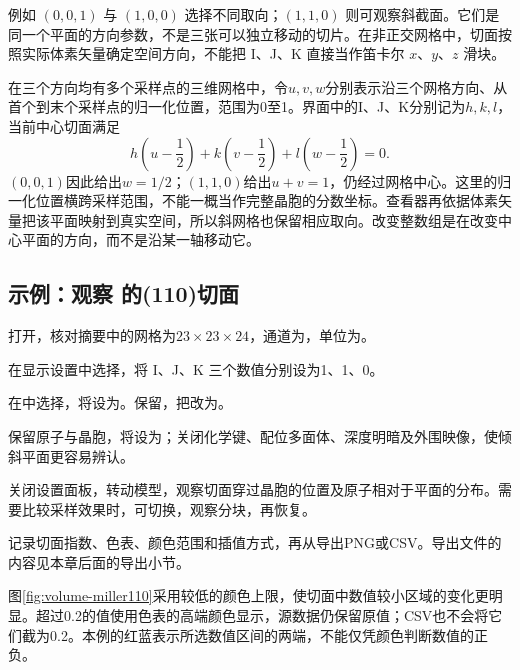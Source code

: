 例如 $(0,0,1)$ 与 $(1,0,0)$ 选择不同取向；$(1,1,0)$ 则可观察斜截面。它们是同一个平面的方向参数，不是三张可以独立移动的切片。在非正交网格中，切面按照实际体素矢量确定空间方向，不能把 I、J、K 直接当作笛卡尔 $x$、$y$、$z$ 滑块。


在三个方向均有多个采样点的三维网格中，令$u,v,w$分别表示沿三个网格方向、从首个到末个采样点的归一化位置，范围为0至1。界面中的I、J、K分别记为$h,k,l$，当前中心切面满足
\begin{equation}
  h\left(u-\frac12\right)
  +k\left(v-\frac12\right)
  +l\left(w-\frac12\right)=0.
  \label{eq:volume-central-miller}
\end{equation}
$(0,0,1)$因此给出$w=1/2$；$(1,1,0)$给出$u+v=1$，仍经过网格中心。这里的归一化位置横跨采样范围，不能一概当作完整晶胞的分数坐标。查看器再依据体素矢量把该平面映射到真实空间，所以斜网格也保留相应取向。改变整数组是在改变中心平面的方向，而不是沿某一轴移动它。

\subsection{示例：观察  的(110)切面}

\begin{steps}
  \item 打开，核对摘要中的网格为$23\times23\times24$，通道为，单位为。
  \item 在显示设置中选择，将 I、J、K 三个数值分别设为1、1、0。
  \item 在中选择，将设为。保留，把改为。
  \item 保留原子与晶胞，将设为；关闭化学键、配位多面体、深度明暗及外围映像，使倾斜平面更容易辨认。
  \item 关闭设置面板，转动模型，观察切面穿过晶胞的位置及原子相对于平面的分布。需要比较采样效果时，可切换，观察分块，再恢复。
  \item 记录切面指数、色表、颜色范围和插值方式，再从导出PNG或CSV。导出文件的内容见本章后面的导出小节。
\end{steps}

图\ref{fig:volume-miller110}采用较低的颜色上限，使切面中数值较小区域的变化更明显。超过0.2的值使用色表的高端颜色显示，源数据仍保留原值；CSV也不会将它们截为0.2。本例的红蓝表示所选数值区间的两端，不能仅凭颜色判断数值的正负。

